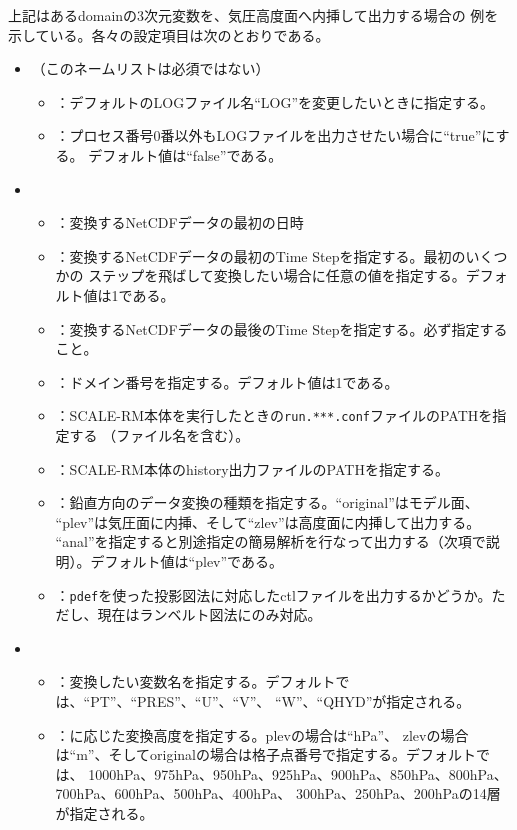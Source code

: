 \noindent 上記はあるdomainの3次元変数を、気圧高度面へ内挿して出力する場合の
例を示している。各々の設定項目は次のとおりである。
\begin{itemize}
 \item {}（このネームリストは必須ではない）
 \begin{itemize}
  \item {}：デフォルトのLOGファイル名``LOG''を変更したいときに指定する。
  \item {}：プロセス番号0番以外もLOGファイルを出力させたい場合に``true''にする。
        デフォルト値は``false''である。
 \end{itemize}
 \item {}
 \begin{itemize}
  \item {}：変換するNetCDFデータの最初の日時
  \item {}：変換するNetCDFデータの最初のTime Stepを指定する。最初のいくつかの
        ステップを飛ばして変換したい場合に任意の値を指定する。デフォルト値は1である。
  \item {}：変換するNetCDFデータの最後のTime Stepを指定する。必ず指定すること。
  \item {}：ドメイン番号を指定する。デフォルト値は1である。
  \item {}：SCALE-RM本体を実行したときの\verb|run.***.conf|ファイルのPATHを指定する
        （ファイル名を含む）。
  \item {}：SCALE-RM本体のhistory出力ファイルのPATHを指定する。
  \item {}：鉛直方向のデータ変換の種類を指定する。``original''はモデル面、
        ``plev''は気圧面に内挿、そして``zlev''は高度面に内挿して出力する。
        ``anal''を指定すると別途指定の簡易解析を行なって出力する（次項で説明）。デフォルト値は``plev''である。
  \item {}：\verb|pdef|を使った投影図法に対応したctlファイルを出力するかどうか。ただし、現在はランベルト図法にのみ対応。
 \end{itemize}
 \item {}
 \begin{itemize}
  \item {}：変換したい変数名を指定する。デフォルトでは、``PT''、``PRES''、``U''、``V''、
        ``W''、``QHYD''が指定される。
  \item {}：に応じた変換高度を指定する。plevの場合は``hPa''、
        zlevの場合は``m''、そしてoriginalの場合は格子点番号で指定する。デフォルトでは、
        1000hPa、975hPa、950hPa、925hPa、900hPa、850hPa、800hPa、700hPa、600hPa、500hPa、400hPa、
        300hPa、250hPa、200hPaの14層が指定される。
 \end{itemize}
\end{itemize}

